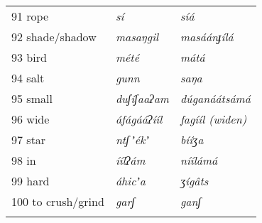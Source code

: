 \documentclass[output=paper]{langsci/langscibook}
\begin{document}
\begin{longtable}{p{}  >{\itshape}p{} >{\itshape}p{}}
91 rope & sí & síá \\

92 shade/shadow & masaŋgil & masáánɟílá \\

93 bird & mété & mátá \\

94 salt & gunn & saŋa \\

95 small & duʃíʃaaʔam & d\'{u}ganáátsámá
\\

96 wide & áfágááʔííl & fagííl \textup{(widen)} \\

97 star & ntʃ\,ʼékʼ & bííʒa \\

98 in & íílʔám & níílámá \\

99 hard & áhicʼa & ʒígâts \\

100 to crush/grind & garʃ & ganʃ \\
\lspbottomrule
\end{longtable}

\newpage 
\printbibliography[heading=subbibliography,notkeyword=this]
\end{document}
